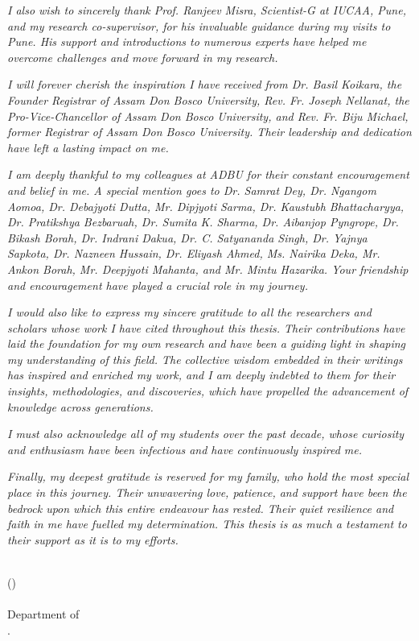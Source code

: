     \par\textsl{I also wish to sincerely thank Prof. Ranjeev Misra, Scientist-G at IUCAA, Pune, and my research co-supervisor, for his invaluable guidance during my visits to Pune. His support and introductions to numerous experts have helped me overcome challenges and move forward in my research.}
    
    \par\textsl{I will forever cherish the inspiration I have received from Dr. Basil Koikara, the Founder Registrar of Assam Don Bosco University, Rev. Fr. Joseph Nellanat, the Pro-Vice-Chancellor of Assam Don Bosco University, and Rev. Fr. Biju Michael, former Registrar of Assam Don Bosco University. Their leadership and dedication have left a lasting impact on me.}
    
    \par\textsl{I am deeply thankful to my colleagues at ADBU for their constant encouragement and belief in me. A special mention goes to Dr. Samrat Dey, Dr. Ngangom Aomoa, Dr. Debajyoti Dutta, Mr. Dipjyoti Sarma, Dr. Kaustubh Bhattacharyya, Dr. Pratikshya Bezbaruah, Dr. Sumita K. Sharma, Dr. Aibanjop Pyngrope, Dr. Bikash Borah, Dr. Indrani Dakua, Dr. C. Satyananda Singh, Dr. Yajnya Sapkota, Dr. Nazneen Hussain, Dr. Eliyash Ahmed, Ms. Nairika Deka, Mr. Ankon Borah, Mr. Deepjyoti Mahanta, and Mr. Mintu Hazarika. Your friendship and encouragement have played a crucial role in my journey.}
    
    \par\textsl{I would also like to express my sincere gratitude to all the researchers and scholars whose work I have cited throughout this thesis. Their contributions have laid the foundation for my own research and have been a guiding light in shaping my understanding of this field. The collective wisdom embedded in their writings has inspired and enriched my work, and I am deeply indebted to them for their insights, methodologies, and discoveries, which have propelled the advancement of knowledge across generations.}
    
    \par\textsl{I must also acknowledge all of my students over the past decade, whose curiosity and enthusiasm have been infectious and have continuously inspired me.}
    
    \par\textsl{Finally, my deepest gratitude is reserved for my family, who hold the most special place in this journey. Their unwavering love, patience, and support have been the bedrock upon which this entire endeavour has rested. Their quiet resilience and faith in me have fuelled my determination. This thesis is as much a testament to their support as it is to my efforts.}
    
    \bigskip\medskip
    \bigskip\medskip
    \bigskip\medskip\bigskip\medskip
    \noindent\\
    \hfill (\authorname)
    \noindent\\
    \hfill {\submissiontime} \\
    \hfill Department of \department\\
    \hfill \university.

